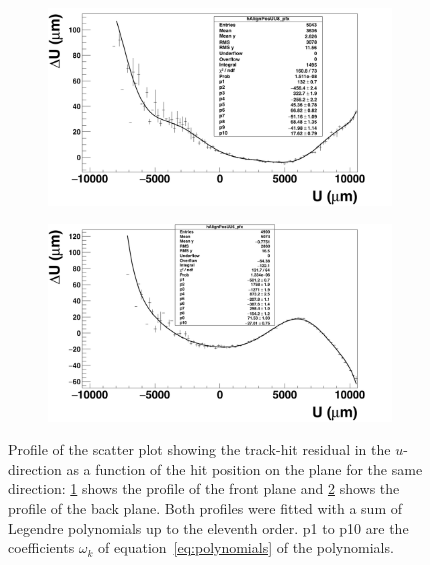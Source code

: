       \begin{figure}[!tbh]
        \centering
        \begin{subfigure}[t]{0.45\textwidth}
          \centering
          \includegraphics[width = 1.2\textwidth]{Pictures/deformation/profileFitted_pl8.png}
          \caption{}
          \label{fig:profileFitted_front}
        \end{subfigure}
        \hfill
        \begin{subfigure}[t]{0.45\textwidth}
          \centering
          \includegraphics[width = 1.2\textwidth]{Pictures/deformation/profileFitted_pl6.png}
          \caption{}
          \label{fig:profileFitted_back}
        \end{subfigure}
        \caption{Profile of the scatter plot showing the track-hit residual in the $u$-direction as a function of the hit position on the plane for the same direction: \ref{fig:profileFitted_front} shows the profile of the front plane and \ref{fig:profileFitted_back} shows the profile of the back plane.
        Both profiles were fitted with a sum of Legendre polynomials up to the eleventh order. 
        p1 to p10 are the coefficients $\omega_k$ of equation~\ref{eq:polynomials} of the polynomials.} 
        \label{fig:profileFitted}
      \end{figure}


